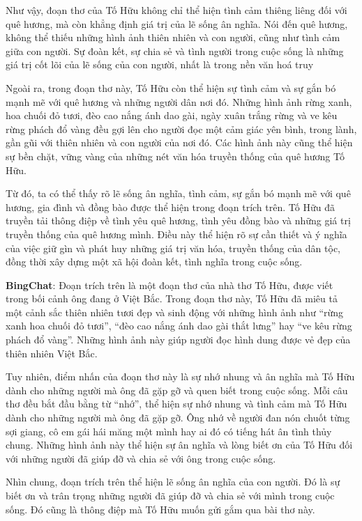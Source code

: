 \documentclass{article}
\begin{document}
{\begin{mdframed}[linewidth=1pt,linecolor=red]
		Như vậy, đoạn thơ của Tố Hữu không chỉ thể hiện tình cảm thiêng liêng đối với quê hương, mà còn khẳng định giá trị của lẽ sống ân nghĩa. Nói đến quê hương, không thể thiếu những hình ảnh thiên nhiên và con người, cũng như tình cảm giữa con người. Sự đoàn kết, sự chia sẻ và tình người trong cuộc sống là những giá trị cốt lõi của lẽ sống của con người, nhất là trong nền văn hoá truy
		
		Ngoài ra, trong đoạn thơ này, Tố Hữu còn thể hiện sự tình cảm và sự gắn bó mạnh mẽ với quê hương và những người dân nơi đó. Những hình ảnh rừng xanh, hoa chuối đỏ tươi, đèo cao nắng ánh dao gài, ngày xuân trắng rừng và ve kêu rừng phách đổ vàng đều gợi lên cho người đọc một cảm giác yên bình, trong lành, gần gũi với thiên nhiên và con người của nơi đó. Các hình ảnh này cũng thể hiện sự bền chặt, vững vàng của những nét văn hóa truyền thống của quê hương Tố Hữu.
		
		Từ đó, ta có thể thấy rõ lẽ sống ân nghĩa, tình cảm, sự gắn bó mạnh mẽ với quê hương, gia đình và đồng bào được thể hiện trong đoạn trích trên. Tố Hữu đã truyền tải thông điệp về tình yêu quê hương, tình yêu đồng bào và những giá trị truyền thống của quê hương mình. Điều này thể hiện rõ sự cần thiết và ý nghĩa của việc giữ gìn và phát huy những giá trị văn hóa, truyền thống của dân tộc, đồng thời xây dựng một xã hội đoàn kết, tình nghĩa trong cuộc sống.
		
		\textbf{BingChat}: Đoạn trích trên là một đoạn thơ của nhà thơ Tố Hữu, được viết trong bối cảnh ông đang ở Việt Bắc. Trong đoạn thơ này, Tố Hữu đã miêu tả một cảnh sắc thiên nhiên tươi đẹp và sinh động với những hình ảnh như “rừng xanh hoa chuối đỏ tươi”, “đèo cao nắng ánh dao gài thắt lưng” hay “ve kêu rừng phách đổ vàng”. Những hình ảnh này giúp người đọc hình dung được vẻ đẹp của thiên nhiên Việt Bắc.
		
		Tuy nhiên, điểm nhấn của đoạn thơ này là sự nhớ nhung và ân nghĩa mà Tố Hữu dành cho những người mà ông đã gặp gỡ và quen biết trong cuộc sống. Mỗi câu thơ đều bắt đầu bằng từ “nhớ”, thể hiện sự nhớ nhung và tình cảm mà Tố Hữu dành cho những người mà ông đã gặp gỡ. Ông nhớ về người đan nón chuốt từng sợi giang, cô em gái hái măng một mình hay ai đó có tiếng hát ân tình thủy chung. Những hình ảnh này thể hiện sự ân nghĩa và lòng biết ơn của Tố Hữu đối với những người đã giúp đỡ và chia sẻ với ông trong cuộc sống.
		
		Nhìn chung, đoạn trích trên thể hiện lẽ sống ân nghĩa của con người. Đó là sự biết ơn và trân trọng những người đã giúp đỡ và chia sẻ với mình trong cuộc sống. Đó cũng là thông điệp mà Tố Hữu muốn gửi gắm qua bài thơ này.
		

\end{mdframed}}
\end{document}

